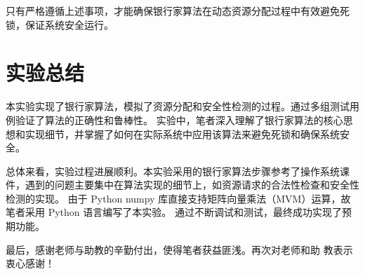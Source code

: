 \documentclass[12pt, a4paper, oneside]{ctexart}
\begin{document}
只有严格遵循上述事项，才能确保银行家算法在动态资源分配过程中有效避免死锁，保证系统安全运行。

\section{实验总结}

本实验实现了银行家算法，模拟了资源分配和安全性检测的过程。通过多组测试用例验证了算法的正确性和鲁棒性。
实验中，笔者深入理解了银行家算法的核心思想和实现细节，并掌握了如何在实际系统中应用该算法来避免死锁和确保系统安全。

总体来看，实验过程进展顺利。本实验采用的银行家算法步骤参考了操作系统课件，遇到的问题主要集中在算法实现的细节上，如资源请求的合法性检查和安全性检测的实现。
由于 Python numpy 库直接支持矩阵向量乘法（MVM）运算，故笔者采用 Python 语言编写了本实验。
通过不断调试和测试，最终成功实现了预期功能。

最后，感谢老师与助教的辛勤付出，使得笔者获益匪浅。再次对老师和助
教表示衷心感谢！
\end{document}
